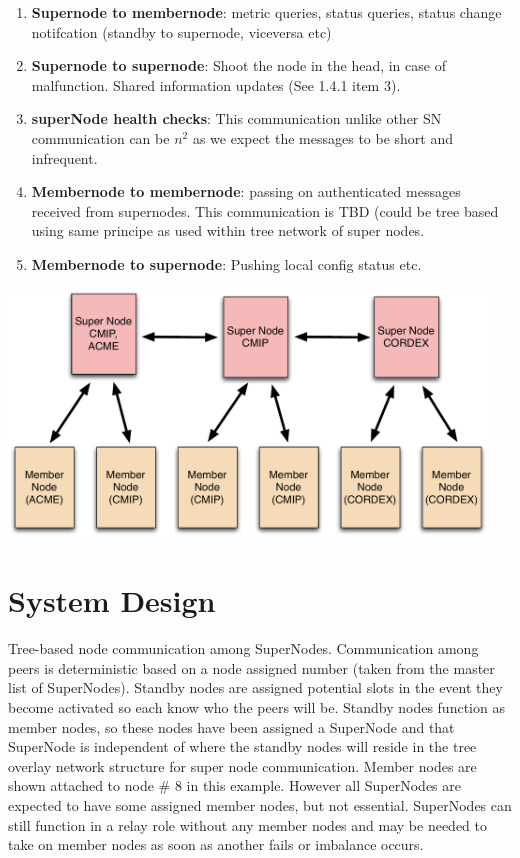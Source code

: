 \documentclass[oneside,12pt]{memoir}
\begin{document}
\begin{enumerate}
\item \textbf{Supernode to membernode}: metric queries, status queries, status change notifcation (standby to supernode, viceversa etc)
\item \textbf{Supernode to supernode}: Shoot the node in the head, in case of malfunction.  Shared information updates (See 1.4.1 item 3). 
\item \textbf{superNode health checks}:  This communication unlike other SN communication can be $n^2$ as we expect the messages to be short and infrequent.  
\item \textbf{Membernode to membernode}: passing on authenticated messages received from supernodes.  This communication is TBD (could be tree based using same principe as used within tree network of super nodes. %
\item \textbf{Membernode to supernode}: Pushing local config status etc.
\end{enumerate}

\begin{center}
\includegraphics[width=5in]{presentation/ESG-node-org.pdf}
\end{center}

\section{System Design}

Tree-based node communication among SuperNodes.  Communication among peers is deterministic based on a node assigned number (taken from the master list of SuperNodes).     Standby nodes are assigned potential slots in the event they become activated so each know who the peers will be.  Standby nodes function as member nodes, so these nodes have been assigned a SuperNode and that SuperNode is independent of where the standby nodes will reside in the tree overlay network structure for super node communication.  Member nodes are shown attached to node \# 8 in this example.  However all SuperNodes are expected to have some assigned member nodes, but not essential.  SuperNodes can still function in a relay role without any member nodes and may be needed to take on member nodes as soon as another fails or imbalance occurs. 
\end{document}
